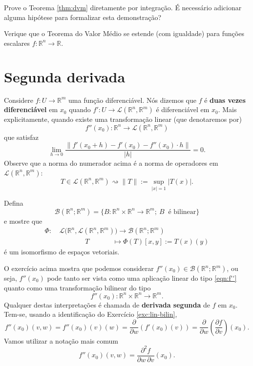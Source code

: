 \begin{exer}
	Prove o Teorema \ref{thm:dvm} diretamente por integração. É necessário adicionar alguma hipótese para formalizar esta demonstração?
\end{exer}


\begin{exer}
	Verique que o Teorema do Valor Médio se estende (com igualdade) para funções escalares $f: \mathbb{R}^n \to \mathbb{R}$.
\end{exer}


\section{Segunda derivada}

Considere $f: U \to \mathbb{R}^m$ uma função diferenciável. Nós dizemos que $f$ é \textbf{duas vezes diferenciável} em $x_0$ quando $f' : U \to \mathcal{L}(\mathbb{R}^n, \mathbb{R}^m)$ é diferenciável em $x_0$. Mais explicitamente, quando existe uma transformação linear (que denotaremos por)
\begin{equation}\label{eqn:f''}
f''(x_0): \mathbb{R}^n \to \mathcal{L}(\mathbb{R}^n, \mathbb{R}^m)
\end{equation} que satisfaz
\[
\lim_{h \to 0}   \frac{\big\|f'(x_0 + h) - f'(x_0) - f''(x_0) \cdot h\big\|}{|h|} = 0.
\] Observe que a norma do numerador acima é a norma de operadores em $\mathcal{L}(\mathbb{R}^n, \mathbb{R}^m)$:
\[
T \in \mathcal{L}(\mathbb{R}^n, \mathbb{R}^m) \rightsquigarrow \|T\| := \sup_{|x|=1} \big|T(x)\big|.
\]

\begin{exer}\label{exc:lin-bilin}
	Defina
	\[
	\mathcal{B}(\mathbb{R}^n; \mathbb{R}^m) = \{ B: \mathbb{R}^n \times \mathbb{R}^n \to \mathbb{R}^m ; ~B \ \text{ é bilinear}\}
	\] e mostre que 
	\[
	\begin{split}
	\Phi: & \ \mathcal{L}\big( \mathbb{R}^n, \mathcal{L}(\mathbb{R}^n, \mathbb{R}^m) \big) \to \mathcal{B}(\mathbb{R}^n; \mathbb{R}^m) \\
	& \qquad  \qquad  T \qquad \ \ \quad \mapsto   \Phi(T)[x,y] := T(x)(y)
	\end{split}
	\] é um isomorfismo de espaços vetoriais. 
\end{exer}

O exercício acima mostra que podemos considerar $f''(x_0) \in \mathcal{B}(\mathbb{R}^n; \mathbb{R}^m)$, ou seja, $f''(x_0)$ pode tanto ser vista como uma aplicação linear do tipo \eqref{eqn:f''} quanto como uma transformação bilinear do tipo
\[
f''(x_0): \mathbb{R}^n \times \mathbb{R}^n \to \mathbb{R}^m.
\] Qualquer destas interpretações é chamada de \textbf{derivada segunda} de $f$ em $x_0$. Tem-se, usando a identificação do Exercício \ref{exc:lin-bilin},
\[
f''(x_0) (v,w) = f''(x_0) (v)(w) = \frac{\partial}{\partial w} \left( f'(x_0) (v) \right) = \frac{\partial}{\partial w} \left( \frac{\partial f}{\partial v} \right) (x_0).
\] Vamos utilizar a notação mais comum 
\[
f''(x_0) (v,w) = \frac{\partial^2 f}{\partial w \ \partial v} (x_0).
\]

